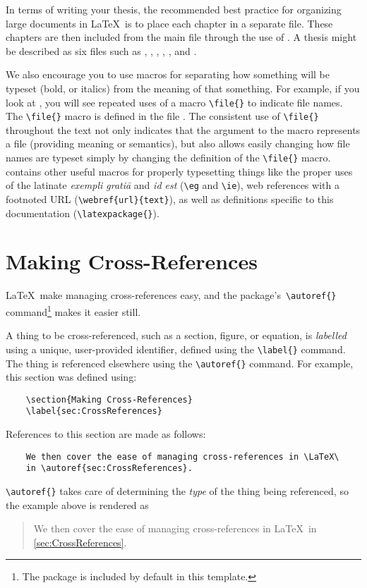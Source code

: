 In terms of writing your thesis, the recommended best practice for
organizing large documents in \LaTeX\ is to place each chapter in
a separate file.  These chapters are then included from the main
file through the use of \verb++.  A thesis might
be described as six files such as ,
, , ,
, and .

We also encourage you to use macros for separating how something
will be typeset (\eg bold, or italics) from the meaning of that
something. 
For example, if you look at , you will see repeated
uses of a macro \verb+\file{}+ to indicate file names.
The \verb+\file{}+ macro is defined in the file .
The consistent use of \verb+\file{}+ throughout the text not only
indicates that the argument to the macro represents a file (providing
meaning or semantics), but also allows easily changing how
file names are typeset simply by changing the definition of the
\verb+\file{}+ macro.
 contains other useful macros for properly typesetting
things like the proper uses of the latinate \emph{exempli grati\={a}}
and \emph{id est} (\ie \verb+\eg+ and \verb+\ie+), 
web references with a footnoted \acs{URL} (\verb+\webref{url}{text}+),
as well as definitions specific to this documentation
(\verb+\latexpackage{}+).

\section{Making Cross-References}
\label{sec:CrossReferences}

\LaTeX\ make managing cross-references easy, and the 
package's\ \verb+\autoref{}+ command\footnote{%
	The  package is included by default in this
	template.}
makes it easier still. 

A thing to be cross-referenced, such as a section, figure, or equation,
is \emph{labelled} using a unique, user-provided identifier, defined
using the \verb+\label{}+ command.  
The thing is referenced elsewhere using the \verb+\autoref{}+ command.
For example, this section was defined using:
\begin{lstlisting}
	\section{Making Cross-References}
	\label{sec:CrossReferences}
\end{lstlisting}
References to this section are made as follows:
\begin{lstlisting}
	We then cover the ease of managing cross-references in \LaTeX\
	in \autoref{sec:CrossReferences}.
\end{lstlisting}
\verb+\autoref{}+ takes care of determining the \emph{type} of the 
thing being referenced, so the example above is rendered as
\begin{quote}
	We then cover the ease of managing cross-references in \LaTeX\
	in \autoref{sec:CrossReferences}.
\end{quote}

